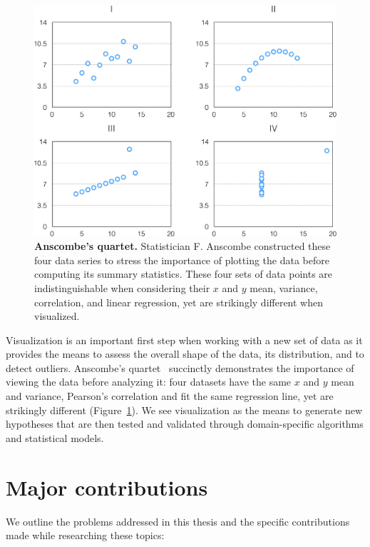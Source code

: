 \begin{figure}[ht]
  \centering
  \includegraphics[width=0.8\linewidth]{figures/anscombes_quartet}
  \caption{\textbf{Anscombe's quartet.} Statistician F. Anscombe constructed these four data series to stress the importance of plotting the data before computing its summary statistics. These four sets of data points are indistinguishable when considering their $x$ and $y$ mean, variance, correlation, and linear regression, yet are strikingly different when visualized.}
  \label{fig:intro:anscombe}
\end{figure}


Visualization is an important first step when working with a new set of data as it provides the means to assess the overall shape of the data, its distribution, and to detect outliers. Anscombe's quartet~\cite{anscombe} succinctly demonstrates the importance of viewing the data before analyzing it: four datasets have the same $x$ and $y$ mean and variance, Pearson's correlation and fit the same regression line, yet are strikingly different (Figure~\ref{fig:intro:anscombe}). We see visualization as the means to generate new hypotheses that are then tested and validated through domain-specific algorithms and statistical models.


\section{Major contributions}

We outline the problems addressed in this thesis and the specific contributions made while researching these topics:

